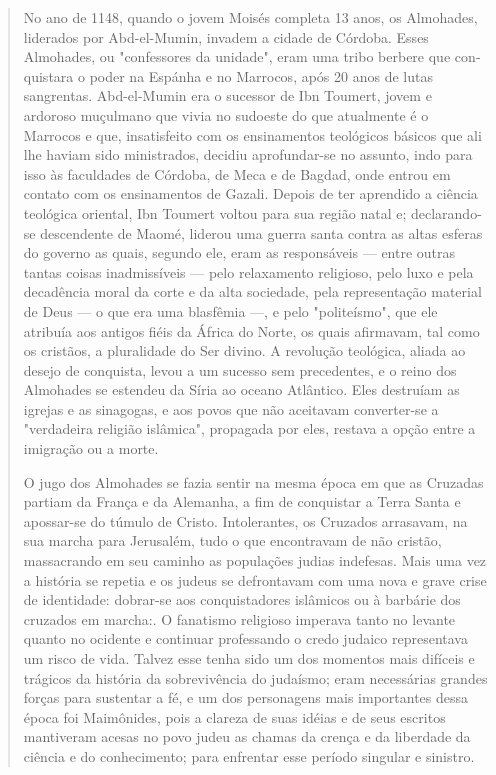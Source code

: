\begin{quote}
No ano de 1148, quando o jovem Moisés completa 13 anos, os Al­mohades,
liderados por Abd-el-Mumin, invadem a cidade de Córdoba. Esses
Almohades, ou "confessores da unidade", eram uma tribo berbere que
con­quistara o poder na Espánha e no Marrocos, após 20 anos de lutas
sangrentas. Abd-el-Mumin era o sucessor de Ibn Toumert, jovem e ardoroso
muçulmano que vivia no sudoeste do que atualmente é o Marrocos e que,
insatisfeito com os ensinamentos teológicos básicos que ali lhe haviam
sido ministrados, deci­diu aprofundar-se no assunto, indo para isso às
faculdades de Córdoba, de Me­ca e de Bagdad, onde entrou em contato com
os ensinamentos de Gazali. De­pois de ter aprendido a ciência teológica
oriental, Ibn Toumert voltou para sua região natal e; declarando-se
descendente de Maomé, liderou uma guerra santa contra as altas esferas
do governo as quais, segundo ele, eram as responsáveis --- entre outras
tantas coisas inadmissíveis --- pelo relaxamento religioso, pelo luxo e
pela decadência moral da corte e da alta sociedade, pela representação
material de Deus --- o que era uma blasfêmia ---, e pelo "politeísmo",
que ele atribuía aos antigos fiéis da África do Norte, os quais
afirmavam, tal como os cristãos, a pluralidade do Ser divino. A
revolução teológica, aliada ao desejo de conquista, levou a um sucesso
sem precedentes, e o reino dos Almohades se estendeu da Síria ao oceano
Atlântico. Eles destruíam as igrejas e as sinago­gas, e aos povos que
não aceitavam converter-se a "verdadeira religião islâmi­ca", propagada
por eles, restava a opção entre a imigração ou a morte.

O jugo dos Almohades se fazia sentir na mesma época em que as Cru­zadas
partiam da França e da Alemanha, a fim de conquistar a Terra Santa e
apossar-se do túmulo de Cristo. Intolerantes, os Cruzados arrasavam, na
sua mar­cha para Jerusalém, tudo o que encontravam de não cristão,
massacrando em seu caminho as populações judias indefesas. Mais uma vez
a história se repetia e os judeus se defrontavam com uma nova e grave
crise de identidade: dobrar-se aos conquistadores islâmicos ou à
barbárie dos cruzados em marcha:. O fana­tismo
religioso imperava tanto no levante quanto no ocidente e continuar
pro­fessando o credo judaico representava um risco de vida. Talvez esse
tenha sido um dos momentos mais difíceis e trágicos da história da
sobrevivência do ju­daísmo; eram necessárias grandes forças para
sustentar a fé, e um dos persona­gens mais importantes dessa época foi
Maimônides, pois a clareza de suas idéias e de seus escritos mantiveram
acesas no povo judeu as chamas da crença e da liberdade da ciência e do
conhecimento; para enfrentar esse período singular e sinistro.


\end{quote}

